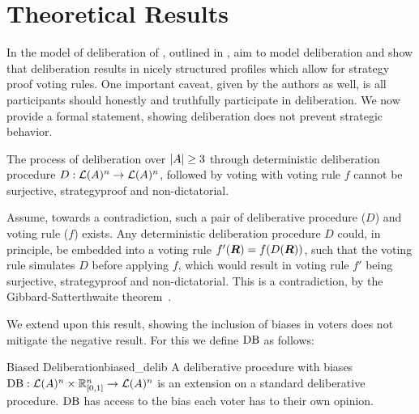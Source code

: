 \newpage
\chapter{Theoretical Results}
\label{theory}


In the model of deliberation of \citet{radDeliberationSinglePeakednessCoherent2021}, outlined in , aim to model deliberation and show that deliberation results in nicely structured profiles which allow for strategy proof voting rules. One important caveat, given by the authors as well, is all participants should honestly and truthfully participate in deliberation. We now provide a formal statement, showing deliberation does not prevent strategic behavior.

\begin{proposition}
	The process of deliberation over $|A| \geq 3$ through deterministic deliberation procedure \({D}: \mathcal{L}(A)^n \to \mathcal{L}(A)^n\), followed by voting with voting rule $f$ cannot be surjective, strategyproof and non-dictatorial.

	\label{proposition:deterministic-delib}
\end{proposition}

\begin{proofc}
	Assume, towards a contradiction, such a pair of deliberative procedure ($D$) and voting rule (\(f\)) exists. Any deterministic deliberation procedure $D$ could, in principle, be embedded into a voting rule $f'(\boldsymbol{R}) = f(D(\boldsymbol{R}))$, such that the voting rule simulates $D$ before applying $f$, which would result in  voting rule $f'$ being surjective, strategyproof and non-dictatorial. This is a contradiction, by the Gibbard-Satterthwaite theorem~\citep{gibbardManipulationVotingSchemes1973,satterthwaiteStrategyproofnessArrowsConditions1975}. \end{proofc}


We extend upon this result, showing the inclusion of biases in voters does not mitigate the negative result. For this we define $\operatorname{DB}$ as follows:

\begin{definition}{Biased Deliberation}{biased_delib}
	A deliberative procedure with biases $\operatorname{DB} : \mathcal{L}(A) ^ n \times \mathbb{R}_{[0,1]}^n \to \mathcal{L}(A)^n$ is an extension on a standard deliberative procedure. \(\operatorname{DB}\) has access to the bias each voter has to their own opinion.
\end{definition}

